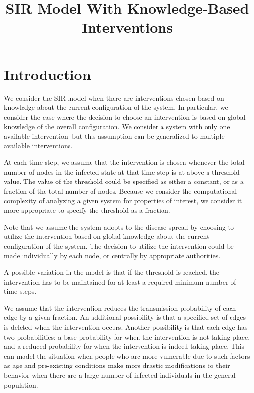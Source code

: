 \documentclass[11pt]{article}
\title{\textbf{SIR Model With Knowledge-Based Interventions}}
\author{  
\vspace*{1ex}  
}
\begin{document}
 
 
\maketitle  
 
\normalbaselineskip

\section{Introduction}
\label{sec:introduction}
  
  We consider the SIR model when there are interventions chosen based on 
  knowledge about the current configuration of the system.
  In particular, we consider the case where the decision to choose an intervention is based on 
  global knowledge of the overall configuration.
  We consider a system with only one available intervention, 
  but this assumption can be generalized to multiple available interventions.
  
  At each time step, we assume that the intervention is chosen whenever the total number of nodes 
  in the infected state at that time step is at above a threshold value.
  The value of the threshold could be specified as either a constant,
  or as a fraction of the total number of nodes.
  Because we consider the computational complexity of analyzing a given system for properties of interest,
  we consider it more appropriate to specify the threshold as a fraction.
  
  Note that we assume the system adopts to the disease spread by choosing to utilize the intervention based on 
  global knowledge about the current configuration of the system.
  The decision to utilize the intervention could be made individually by each node,
  or centrally by appropriate authorities.
  
  A possible variation in the model is that if the threshold is reached, the intervention has to be maintained for 
  at least a required minimum number of time steps.
  
  We assume that the intervention reduces the transmission probability of each edge by a given fraction.
  An additional possibility is that a specified set of edges is deleted when the intervention occurs.
  Another possibility is that each edge has two probabilities:
  a base probability for when the intervention is not taking place,
  and a reduced probability for when the intervention is indeed taking place.
  This can model the situation when people who are more vulnerable 
  due to such factors as age and pre-existing conditions
  make more drastic modifications to their behavior when 
  there are a large number of infected individuals in the general population.
  
\end{document}
